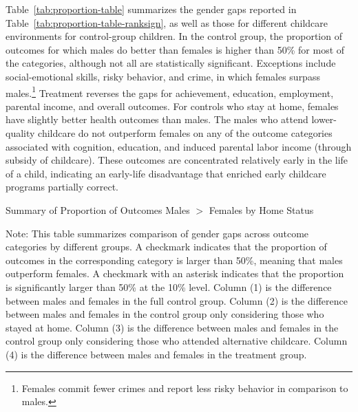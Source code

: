 Table~\ref{tab:proportion-table} summarizes the gender gaps reported in Table~\ref{tab:proportion-table-ranksign}, as well as those for different childcare environments for control-group children. In the control group, the proportion of outcomes for which males do better than females is higher than 50\% for most of the categories, although not all are statistically significant. Exceptions include social-emotional skills, risky behavior, and crime, in which females surpass males.\footnote{Females commit fewer crimes and report less risky behavior in comparison to males.} Treatment reverses the gaps for achievement, education, employment, parental income, and overall outcomes. For controls who stay at home, females have slightly better health outcomes than males. The males who attend lower-quality childcare do not outperform females on any of the outcome categories associated with cognition, education, and induced parental labor income (through subsidy of childcare). These outcomes are concentrated relatively early in the life of a child, indicating an early-life disadvantage that enriched early childcare programs partially correct.

\begin{table}[H]
\centering
\caption{Summary of Proportion of Outcomes Males $>$ Females by Home Status}
\label{tab:proportion-table}
\begin{threeparttable}
\begin{footnotesize}

\end{footnotesize}
\begin{tablenotes}
\footnotesize
\item Note: This table summarizes comparison of gender gaps across outcome categories by different groups. A checkmark indicates that the proportion of outcomes in the corresponding category is larger than 50\%, meaning that males outperform females. A checkmark with an asterisk indicates that the proportion is significantly larger than 50\% at the 10\% level. Column (1) is the difference between males and females in the full control group.  Column (2) is the difference between males and females in the control group only considering those who stayed at home. Column (3) is the difference between males and females in the control group only considering those who attended alternative childcare. Column (4) is the difference between males and females in the treatment group.
\end{tablenotes}
\end{threeparttable}
\end{table}

